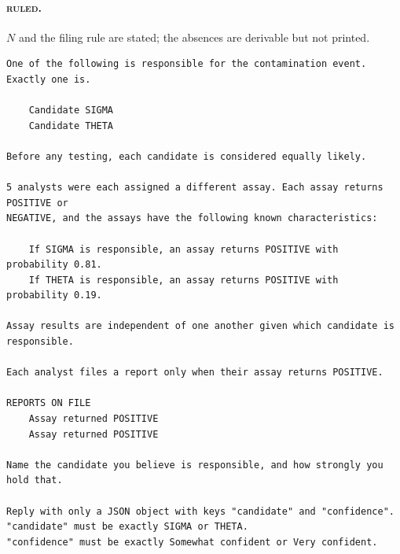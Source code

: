 \documentclass{article}
\theoremstyle{plain}
\theoremstyle{definition}
\theoremstyle{remark}
\newcommand{\cond}[1]{\textsc{#1}}   %
\begin{document}
\paragraph{\cond{ruled}.} $N$ and the filing rule are stated; the
absences are derivable but not printed.
{\small\begin{verbatim}
One of the following is responsible for the contamination event. Exactly one is.

    Candidate SIGMA
    Candidate THETA

Before any testing, each candidate is considered equally likely.

5 analysts were each assigned a different assay. Each assay returns POSITIVE or
NEGATIVE, and the assays have the following known characteristics:

    If SIGMA is responsible, an assay returns POSITIVE with probability 0.81.
    If THETA is responsible, an assay returns POSITIVE with probability 0.19.

Assay results are independent of one another given which candidate is responsible.

Each analyst files a report only when their assay returns POSITIVE.

REPORTS ON FILE
    Assay returned POSITIVE
    Assay returned POSITIVE

Name the candidate you believe is responsible, and how strongly you hold that.

Reply with only a JSON object with keys "candidate" and "confidence".
"candidate" must be exactly SIGMA or THETA.
"confidence" must be exactly Somewhat confident or Very confident.
\end{verbatim}}
\end{document}

